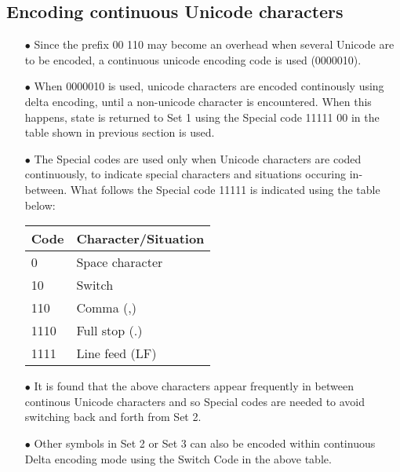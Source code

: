 \documentclass[]{article}
\begin{document}
\subsection{Encoding continuous Unicode characters}
\begin{itemize}
	\item[$\bullet$] Since the prefix 00 110 may become an overhead when several Unicode are to be encoded, a continuous unicode encoding code is used (0000010).
	\item[$\bullet$] When 0000010 is used, unicode characters are encoded continously using delta encoding, until a non-unicode character is encountered.  When this happens, state is returned to Set 1 using the Special code 11111 00 in the table shown in previous section is used.
	\item[$\bullet$] The Special codes are used only when Unicode characters are coded continuously, to indicate special characters and situations occuring in-between. What follows the Special code 11111 is indicated using the table below:
	\item[] \begin{tabular}{ | l | l |} \hline
	﻿\textbf{Code} & ﻿\textbf{Character/Situation} \\ \hline
	0 & Space character \\ \hline
	10 & Switch \\ \hline
	110 & Comma (,) \\ \hline
	1110 & Full stop (.) \\ \hline
	1111 & Line feed (LF) \\ \hline
    \end{tabular}
	\item[$\bullet$] It is found that the above characters appear frequently in between continous Unicode characters and so Special codes are needed to avoid switching back and forth from Set 2.
	\item[$\bullet$] Other symbols in Set 2 or Set 3 can also be encoded within continuous Delta encoding mode using the Switch Code in the above table.
\end{itemize}
\end{document}
